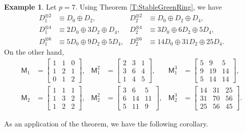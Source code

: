 \documentclass[12pt,reqno]{amsart}
\newcommand{\sym}[1]{\mathfrak{S}_{#1}}
\newcommand{\F}{{F}}
\newcommand{\M}{\mathsf{M}}
\theoremstyle{definition}
\newtheorem{eg}[thm]{Example}
\numberwithin{equation}{section}
\begin{document}
\begin{eg}\label{Eg:p7D12}
    Let $p=7$. Using Theorem \ref{T:StableGreenRing}, we have
    \begin{align*} 
    D_1^{\otimes 2} &\equiv D_0 \oplus D_2,& D_2^{\otimes 2}&\equiv D_0\oplus D_2\oplus D_4, \\
    D_1^{\otimes 4} &\equiv 2D_0 \oplus 3 D_2 \oplus D_4,& D_2^{\otimes 4}&\equiv 3D_0\oplus 6D_2\oplus 5D_4, \\
    D_1^{\otimes 6} &\equiv 5 D_0 \oplus 9 D_2 \oplus 5 D_4,& D_2^{\otimes 6}&\equiv 14D_0\oplus 31D_2\oplus 25D_4.
    \end{align*} On the other hand, 
    \begin{align*}
	\M_{1} &= \begin{bmatrix} 1 & 1 & 0 \\ 1 & 2 & 1 \\ 0 & 1 & 2 \end{bmatrix},& \M_1^2 &= \begin{bmatrix} 2 & 3  & 1\\3 & 6 & 4 \\ 1 & 4 & 5 \end{bmatrix}, &\M_1^3 &= \begin{bmatrix} 5 & 9 & 5 \\ 9 & 19 &  14 \\ 5 & 14 & 14 \end{bmatrix},\\ 
	\M_{2} &= \begin{bmatrix} 1 & 1 & 1 \\ 1 & 3 & 2 \\ 1 & 2 & 2 \end{bmatrix},& \M_2^2 &= \begin{bmatrix} 3 & 6  & 5 \\ 6 & 14 & 11 \\ 5 & 11 & 9 \end{bmatrix},&\M_2^3 &= \begin{bmatrix} 14 & 31 & 25 \\ 31 & 70 &  56 \\ 25 & 56 & 45 \end{bmatrix}.
	\end{align*}
\end{eg}

As an application of the theorem, we have the following corollary. %
\end{document}
